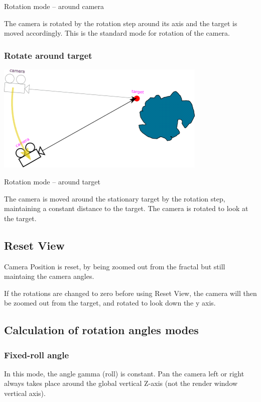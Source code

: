 Rotation mode -- around camera

The camera is rotated by the rotation step around its axis and the target is
moved accordingly. This is the standard mode for rotation of the camera.

\subsubsection{Rotate around target}\label{rotate-around-target}

\includegraphics[width=3.95347in,height=2.03472in]{img/manual/media/image15.png}

Rotation mode -- around target

The camera is moved around the stationary target by the rotation step,
maintaining a constant distance to the target. The camera is rotated to look at
the target.

\subsection{Reset View}\label{reset-view}

Camera Position is reset, by being zoomed out from the fractal but still
maintaing the camera angles.

If the rotations are changed to zero before using Reset View, the camera will
then be zoomed out from the target, and rotated to look down the y axis.

\subsection{Calculation of rotation angles
	modes}\label{calculation-of-rotation-angles-modes}

\subsubsection{Fixed-roll angle}\label{fixed-roll-angle}

In this mode, the angle gamma (roll) is constant. Pan the camera left or right
always takes place around the global vertical Z-axis (not the render window
vertical axis).

